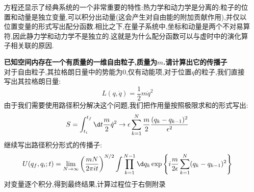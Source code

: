 方程还显示了经典系统的一个非常重要的特性:热力学和动力学是分离的:粒子的位置和动量是独立变量,可以积分出动量(这会产生对自由能的附加贡献作用),并仅以位置变量的形式写出配分函数.相比之下,在量子系统中,坐标和动量是两个不对易算符,因此静力学和动力学不是独立的.这就是为什么配分函数可以与虚时中的演化算子相关联的原因.

\begin{kaobox}[frametitle=题目:空间内存在一个有质量的一维自由粒子]
\textbf{已知空间内存在一个有质量的一维自由粒子,质量为$ m $.请计算出它的传播子}\\
    对于自由粒子,其拉格朗日量中的势能为$ 0 $,仅有动能项,对于位置$ q $的粒子,我们直接写出其拉格朗日量:
    \begin{equation}
        L(q,\dot q)=\frac12m\dot q^2
    \end{equation}
    由于我们需要使用路径积分解决这个问题,我们把作用量按照极限求和的形式写出:
    \begin{equation}
        S=\int_{t_i}^{t_f} \d t\frac{m}{2}\dot{q}^2\to \epsilon\sum_{k=1}^N\frac{m}{2}\frac{(q_k-q_{k-1})^2}{\epsilon^2}
    \end{equation}
    继续写出路径积分形式的传播子:
    \begin{equation}
        U(q_f,q_i;t)=\lim_{N\to\infty}\left(\frac{mN}{2\pi it}\right)^{N/2}\int\prod_{k=1}^{N-1}\d q_k\exp\left\{i\frac{m}{2\epsilon}\sum_{k=1}^N(q_k-q_{k-1})^2\right\}
    \end{equation}
    对变量逐个积分,得到最终结果,计算过程位于右侧附录
    

\end{kaobox}
